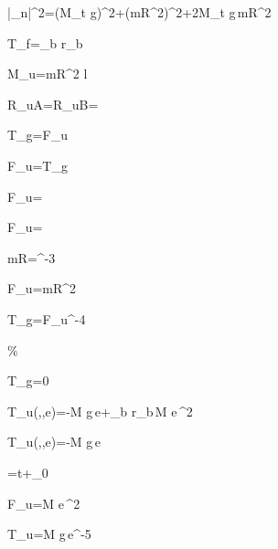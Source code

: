 \left|_n\right|^2=\left(M_t g\right)^2+\left(mR\omega^2\right)^2+2M_t g\,mR\omega^2\cos\varphi

\Delta T_f=\mu_b r_b

M_u=mR\omega^2 l

R_{uA}=R_{uB}=

T_g=F_u

F_u=T_g

F_u=

F_u=\ 

mR=^{-3}\ 

F_u=mR\omega^2\ 

T_g=F_u^{-4}\ 

\%

T_g=0

\pm{}

T_u\left(\theta,\omega,e\right)=-M g\,e\sin\theta+\mu_b r_b\,M e\,\omega^2\cos\theta

T_u\left(\theta,\omega,e\right)=-\kappa M g\,e\sin\theta

\theta=\omega t+\theta_0

F_u=M e\,\omega^2

T_u=M g\,e^{-5}\ 
